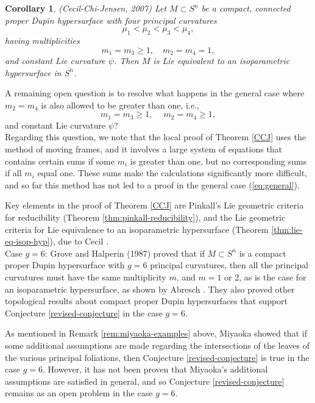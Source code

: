 \documentclass[12pt]{article}
\newtheorem{corollary}{Corollary}[section]
\begin{document}
{\begin{corollary}
\label{cor:CCJ-compact}
(Cecil-Chi-Jensen, 2007)
Let $M \subset S^n$ be a compact, connected proper Dupin hypersurface with 
four principal curvatures 
\begin{displaymath}
\label{eq:pc-order-2}
\mu_1 < \mu_2 < \mu_3 < \mu_4,
\end{displaymath}
having multiplicities
\begin{displaymath}
m_1 = m_3 \geq 1, \quad m_2 = m_4 =1,
\end{displaymath}
and constant Lie curvature $\psi$.  Then $M$ is Lie equivalent to an isoparametric hypersurface in $S^n$.
\end{corollary}

A remaining open question is to resolve what happens in
the general case where $m_2 = m_4$ is also allowed to be greater than one, i.e.,
\begin{equation}
\label{eq:general}
m_1 = m_3 \geq 1,\quad  \ m_2 = m_4 \geq 1,
\end{equation}
and constant Lie curvature $\psi$?\\

\noindent
Regarding this question, we note that
the local proof of Theorem \ref{CCJ} uses the method of moving frames, and it involves a large system
of equations that contains certain sums if some $m_i$ is greater than one, but no 
corresponding sums if all $m_i$ equal one.  These sums make the calculations significantly more difficult, and
so far this method has not led to a proof in the general case (\ref{eq:general}).


Key elements in the proof of Theorem \ref{CCJ}
are Pinkall's \cite{P2} Lie geometric criteria for reducibility (Theorem 
\ref{thm:pinkall-reducibility}), and the Lie geometric criteria for Lie equivalence to
an isoparametric hypersurface (Theorem \ref{thm:lie-eq-isop-hyp}), due to Cecil \cite[p. 77]{Cec9}.\\


\noindent
Case $g = 6$:
Grove and Halperin (1987) proved that if $M \subset S^n$ is a compact proper Dupin hypersurface
with $g=6$ principal curvatures, then all the principal curvatures must have the same multiplicity $m$, and
$m = 1$ or 2, as is the case for an isoparametric hypersurface, as shown by Abresch \cite{Ab}.
They also proved other topological 
results about compact proper Dupin hypersurfaces that support Conjecture \ref{revised-conjecture} in the case $g=6$.

As mentioned in Remark \ref{rem:miyaoka-examples} above,
Miyaoka \cite{Mi3} showed that if some additional assumptions are made regarding the intersections of the leaves of the various principal foliations, then Conjecture \ref{revised-conjecture} is true in the case $g=6$.  
However, it has not been proven that Miyaoka's additional assumptions are satisfied in general,
and so Conjecture \ref{revised-conjecture} remains as an open problem in the case $g=6$.\\
 

}
\end{document}
